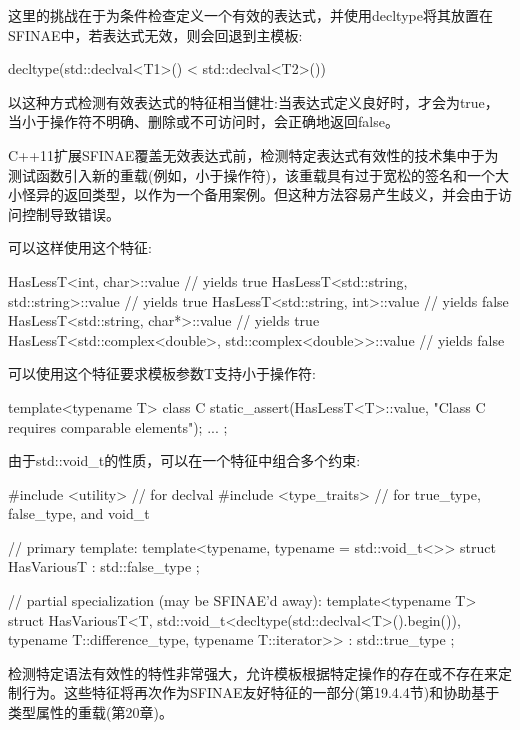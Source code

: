 这里的挑战在于为条件检查定义一个有效的表达式，并使用decltype将其放置在SFINAE中，若表达式无效，则会回退到主模板:

\begin{cpp}
decltype(std::declval<T1>() < std::declval<T2>())
\end{cpp}

以这种方式检测有效表达式的特征相当健壮:当表达式定义良好时，才会为true，当小于操作符不明确、删除或不可访问时，会正确地返回false。

\begin{notice}
C++11扩展SFINAE覆盖无效表达式前，检测特定表达式有效性的技术集中于为测试函数引入新的重载(例如，小于操作符)，该重载具有过于宽松的签名和一个大小怪异的返回类型，以作为一个备用案例。但这种方法容易产生歧义，并会由于访问控制导致错误。
\end{notice}

可以这样使用这个特征:

\begin{cpp}
HasLessT<int, char>::value // yields true
HasLessT<std::string, std::string>::value // yields true
HasLessT<std::string, int>::value // yields false
HasLessT<std::string, char*>::value // yields true
HasLessT<std::complex<double>, std::complex<double>>::value // yields false
\end{cpp}

可以使用这个特征要求模板参数T支持小于操作符:

\begin{cpp}
template<typename T>
class C
{
	static_assert(HasLessT<T>::value,
				  "Class C requires comparable elements");
	...
};
\end{cpp}

由于std::void\_t的性质，可以在一个特征中组合多个约束:

\begin{cpp}
#include <utility> // for declval
#include <type_traits> // for true_type, false_type, and void_t

// primary template:
template<typename, typename = std::void_t<>>
struct HasVariousT : std::false_type
{
};

// partial specialization (may be SFINAE’d away):
template<typename T>
struct HasVariousT<T, std::void_t<decltype(std::declval<T>().begin()),
					typename T::difference_type,
					typename T::iterator>>
: std::true_type
{
};
\end{cpp}

检测特定语法有效性的特性非常强大，允许模板根据特定操作的存在或不存在来定制行为。这些特征将再次作为SFINAE友好特征的一部分(第19.4.4节)和协助基于类型属性的重载(第20章)。

